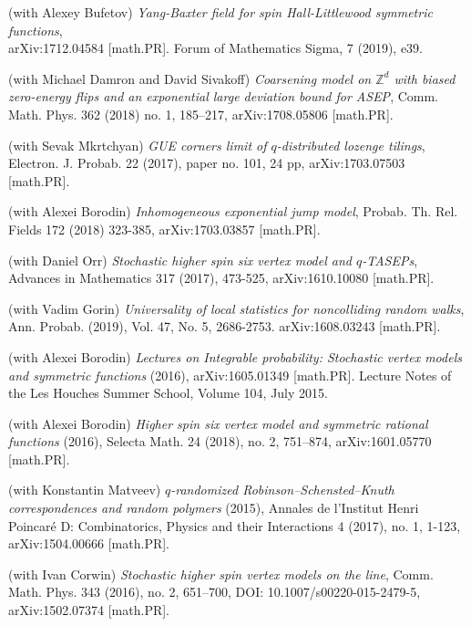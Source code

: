 \documentclass[letterpaper,11pt]{article}
\begin{document}
\begin{etaremune}
	
	\item (with Alexey Bufetov)
		\emph{Yang-Baxter field for spin Hall-Littlewood symmetric functions},\\
		arXiv:1712.04584 [math.PR]. Forum of Mathematics Sigma, 7 (2019), e39.
\item
	      (with Michael Damron and David Sivakoff) \emph{Coarsening model
		      on $\mathbb{Z}^d$ with biased zero-energy flips and an exponential large
			deviation bound for ASEP}, 
			Comm. Math. Phys. 362 (2018) no. 1, 185–217,
			arXiv:1708.05806 [math.PR].	
\item
	      (with Sevak Mkrtchyan)
	      \emph{GUE corners limit of $q$-distributed lozenge tilings},
				Electron. J. Probab. 22 (2017), paper no. 101, 24 pp,
				arXiv:1703.07503 [math.PR].
	\item
	      (with Alexei Borodin)
	      \emph{Inhomogeneous exponential jump model},
				Probab. Th. Rel. Fields
				172 (2018) 323-385,
				arXiv:1703.03857 [math.PR].
	\item
	      (with Daniel Orr)
	      \emph{Stochastic higher spin six vertex model and $q$-TASEPs},
	      Advances in Mathematics 317 (2017), 473-525, arXiv:1610.10080
	      [math.PR].
	\item  
	      (with Vadim Gorin)
	      \emph{Universality of local statistics for noncolliding random
		      walks},
			  Ann. Probab. (2019), Vol. 47, No. 5, 2686-2753.
			  arXiv:1608.03243 [math.PR].
	\item
	      (with Alexei Borodin)
	      \emph{Lectures on Integrable probability: Stochastic vertex
		      models and symmetric functions}
	      (2016), arXiv:1605.01349 [math.PR]. Lecture Notes of the Les
	      Houches Summer School, Volume 104, July 2015.
	\item
	      (with Alexei Borodin)
	      \emph{Higher spin six vertex model and symmetric rational
		      functions}
	      (2016),
				Selecta Math. 24 (2018), no. 2, 751--874,
	      arXiv:1601.05770 [math.PR].
	\item
	      (with Konstantin Matveev)
	      \emph{$q$-randomized Robinson--Schensted--Knuth correspondences
		      and random polymers}
	      (2015),
	      Annales de l'Institut Henri Poincar\'e D: Combinatorics, Physics
	      and their Interactions 4 (2017), no. 1, 1-123, arXiv:1504.00666 [math.PR].
	\item
	      (with Ivan Corwin)
	      \emph{Stochastic higher spin vertex models on the line},
	      Comm. Math. Phys. 343 (2016), no. 2, 651--700, DOI:
	      10.1007/s00220-015-2479-5, arXiv:1502.07374 [math.PR].

\end{etaremune}
\end{document}
